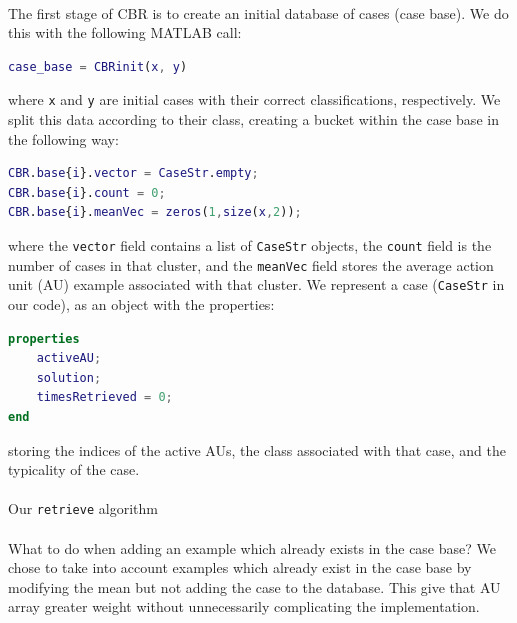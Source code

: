 \documentclass[a4paper,12pt,oneside,final]{report}
\newenvironment{changemargin}[2]{\begin{list}{}{%
\setlength{\topsep}{0pt}%
\setlength{\leftmargin}{0pt}%
\setlength{\rightmargin}{0pt}%
\setlength{\listparindent}{\parindent}%
\setlength{\itemindent}{\parindent}%
\setlength{\parsep}{0pt plus 1pt}%
\addtolength{\leftmargin}{#1}%
\addtolength{\rightmargin}{#2}%
}\item }{\end{list}}
\begin{document}
\paragraph{}
The first stage of CBR is to create an initial database of cases (case base).  We do this with the following MATLAB call:
\begin{changemargin}{-5mm}{-5mm}
\begin{lstlisting}[language=Matlab, frame=single]
case_base = CBRinit(x, y)
\end{lstlisting}
\end{changemargin}
where \verb+x+ and \verb+y+ are initial cases with their correct classifications, respectively.  We split this data according to their class, creating a bucket within the case base in the following way:
\begin{changemargin}{-5mm}{-5mm}
\begin{lstlisting}[language=Matlab, frame=single]
CBR.base{i}.vector = CaseStr.empty;
CBR.base{i}.count = 0;
CBR.base{i}.meanVec = zeros(1,size(x,2));
\end{lstlisting}
\end{changemargin}
where the \verb+vector+ field contains a list of \verb+CaseStr+ objects, the \verb+count+ field is the number of cases in that cluster, and the \verb+meanVec+ field stores the average action unit (AU) example associated with that cluster.  
We represent a case (\verb+CaseStr+ in our code), as an object with the properties:
\begin{changemargin}{-5mm}{-5mm}
\begin{lstlisting}[language=Matlab, frame=single]
properties
    activeAU;
    solution;
    timesRetrieved = 0;
end
\end{lstlisting}
\end{changemargin}
storing the indices of the active AUs, the class associated with that case, and the typicality of the case.

\paragraph{}
Our \verb+retrieve+ algorithm 
\paragraph{}
What to do when adding an example which already exists in the case base?  We chose to take into account examples which already exist in the case base by modifying the mean but not adding the case to the database.  This give that AU array greater weight without unnecessarily complicating the implementation.
\end{document}
